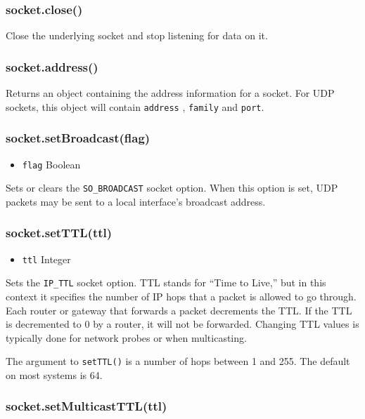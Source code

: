 \subsubsection{socket.close()}

Close the underlying socket and stop listening for data on it.

\subsubsection{socket.address()}

Returns an object containing the address information for a socket. For
UDP sockets, this object will contain \texttt{address} , \texttt{family}
and \texttt{port}.

\subsubsection{socket.setBroadcast(flag)}

\begin{itemize}
\item
  \texttt{flag} Boolean
\end{itemize}

Sets or clears the \texttt{SO\_BROADCAST} socket option. When this
option is set, UDP packets may be sent to a local interface's broadcast
address.

\subsubsection{socket.setTTL(ttl)}

\begin{itemize}
\item
  \texttt{ttl} Integer
\end{itemize}

Sets the \texttt{IP\_TTL} socket option. TTL stands for ``Time to
Live,'' but in this context it specifies the number of IP hops that a
packet is allowed to go through. Each router or gateway that forwards a
packet decrements the TTL. If the TTL is decremented to 0 by a router,
it will not be forwarded. Changing TTL values is typically done for
network probes or when multicasting.

The argument to \texttt{setTTL()} is a number of hops between 1 and 255.
The default on most systems is 64.

\subsubsection{socket.setMulticastTTL(ttl)}

